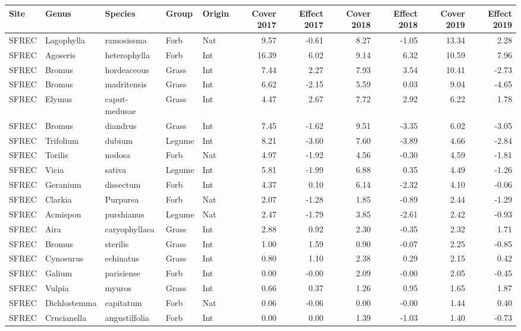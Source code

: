 \documentclass[twoside,12pt,final]{ucthesis-CA2012}
\begin{document}
\begin{ucmainmatter}
\begin{table}[ht]
{\begin{tabular}{lllllrrrrrr}
  \hline
Site & Genus & Species & Group & Origin & Cover 2017 & Effect 2017 & Cover 2018 & Effect 2018 & Cover 2019 & Effect 2019 \\ 
  \hline
SFREC & Lagophylla & ramosissma & Forb & Nat & 9.57 & -0.61 & 8.27 & -1.05 & 13.34 & 2.28 \\ 
  SFREC & Agoseris & heterophylla & Forb & Int & 16.39 & 6.02 & 9.14 & 6.32 & 10.59 & 7.96 \\ 
  SFREC & Bromus & hordeaceous & Grass & Int & 7.44 & 2.27 & 7.93 & 3.54 & 10.41 & -2.73 \\ 
  SFREC & Bromus & madritensis & Grass & Int & 6.62 & -2.15 & 5.59 & 0.03 & 9.04 & -4.65 \\ 
  SFREC & Elymus & caput-medusae & Grass & Int & 4.47 & 2.67 & 7.72 & 2.92 & 6.22 & 1.78 \\ 
  SFREC & Bromus & diandrus & Grass & Int & 7.45 & -1.62 & 9.51 & -3.35 & 6.02 & -3.05 \\ 
  SFREC & Trifolium & dubium & Legume & Int & 8.21 & -3.60 & 7.60 & -3.89 & 4.66 & -2.84 \\ 
  SFREC & Torilis & nodosa & Forb & Nat & 4.97 & -1.92 & 4.56 & -0.30 & 4.59 & -1.81 \\ 
  SFREC & Vicia & sativa & Legume & Int & 5.81 & -1.99 & 6.88 & 0.35 & 4.49 & -1.26 \\ 
  SFREC & Geranium & dissectum & Forb & Int & 4.37 & 0.10 & 6.14 & -2.32 & 4.10 & -0.06 \\ 
  SFREC & Clarkia & Purpurea & Forb & Nat & 2.07 & -1.28 & 1.85 & -0.89 & 2.44 & -1.29 \\ 
  SFREC & Acmispon & purshianus & Legume & Nat & 2.47 & -1.79 & 3.85 & -2.61 & 2.42 & -0.93 \\ 
  SFREC & Aira & caryophyllaea & Grass & Int & 2.88 & 0.92 & 2.30 & -0.35 & 2.32 & 1.71 \\ 
  SFREC & Bromus & sterilis & Grass & Int & 1.00 & 1.59 & 0.90 & -0.07 & 2.25 & -0.85 \\ 
  SFREC & Cynosurus & echinatus & Grass & Int & 0.80 & 1.10 & 2.38 & 0.29 & 2.15 & 0.42 \\ 
  SFREC & Galium & parisiense & Forb & Int & 0.00 & -0.00 & 2.09 & -0.00 & 2.05 & -0.45 \\ 
  SFREC & Vulpia & myuros & Grass & Int & 0.66 & 0.37 & 1.26 & 0.95 & 1.65 & 1.87 \\ 
  SFREC & Dichlostemma & capitatum & Forb & Nat & 0.06 & -0.06 & 0.00 & -0.00 & 1.44 & 0.40 \\ 
  SFREC & Crucianella & angustilfolia & Forb & Int & 0.00 & 0.00 & 1.39 & -1.03 & 1.40 & -0.73 \\ 

\end{tabular}}
\end{table}
\end{ucmainmatter}
\end{document}
